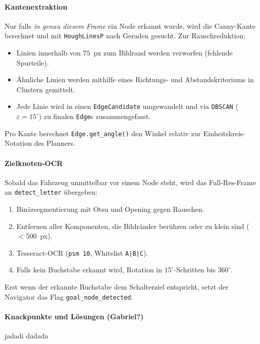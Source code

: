 \documentclass[main.tex]{subfiles} %
\begin{document}
\paragraph{Kantenextraktion}
Nur falls \emph{in genau diesem Frame} ein Node erkannt wurde, wird
die Canny-Kante berechnet und mit \texttt{HoughLinesP} nach Geraden
gesucht.
Zur Rauschreduktion:
\begin{itemize}
  \item Linien innerhalb von $75$~px zum Bildrand werden verworfen
    (fehlende Spurteile).
  \item Ähnliche Linien werden mithilfe
    eines Richtungs- und Abstandskriteriums in Clustern gemittelt.
  \item Jede Linie wird in einen \texttt{EdgeCandidate} umgewandelt
    und via \texttt{DBSCAN} ($\varepsilon=15^{\circ}$) zu
    finalen \texttt{Edge}s zusammengefasst.
\end{itemize}
Pro Kante berechnet \texttt{Edge.get\_angle()} den Winkel relativ zur
Einheitskreis-Notation des Planners.

\paragraph{Zielknoten-OCR}
Sobald das Fahrzeug unmittelbar vor einem Node steht, wird das
Full-Res-Frame an \texttt{detect\_letter} übergeben:
\begin{enumerate}
  \item Binärsegmentierung mit Otsu und Opening gegen Rauschen.
  \item Entfernen aller Komponenten, die Bildränder berühren oder
    zu klein sind ($<500$~px).
  \item Tesseract-OCR (\texttt{psm 10}, Whitelist \texttt{A|B|C}).
  \item Falls kein Buchstabe erkannt wird, Rotation in
    $15^{\circ}$-Schritten bis $360^{\circ}$.
\end{enumerate}
Erst wenn der erkannte Buchstabe dem
Schalterziel entspricht, setzt der Navigator das Flag
\texttt{goal\_node\_detected}.

\paragraph{Knackpunkte und Lösungen (Gabriel?)}
jadadi dadada
\end{document}

